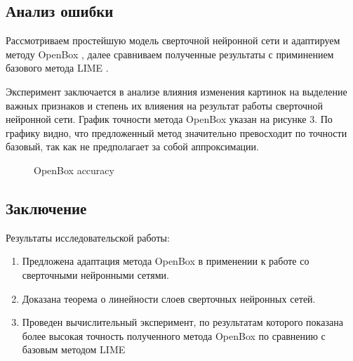 \documentclass[12pt]{article}
\begin{document}
\newpage

\subsection{Анализ ошибки}

Рассмотриваем простейшую модель сверточной нейронной сети и адаптируем методу OpenBox \cite{chu2019exact}, далее сравниваем полученные результаты с приминением базового метода LIME \cite{ribeiro2016why}. 

Эксперимент заключается в анализе влияния изменения картинок на выделение важных признаков и степень их влияения на результат работы сверточной нейронной сети. График точности метода OpenBox указан на рисунке 3. По графику видно, что предложенный метод значительно превосходит по точности базовый, так как не предполагает за собой аппроксимации.

\begin{figure}
\caption{OpenBox accuracy}
\label{fig:image2}
\end{figure}

\newpage

\subsection{Заключение}
    \begin{block}{Результаты исследовательской работы:}
    \begin{enumerate}
        \item Предложена адаптация метода OpenBox в применении к работе со сверточными нейронными сетями.
        \item Доказана теорема о линейности слоев сверточных нейронных сетей.
        \item Проведен вычислительный эксперимент, по результатам которого показана более высокая точность полученного метода OpenBox по сравнению с базовым методом LIME
    \end{enumerate}
    \end{block}


\end{document}
